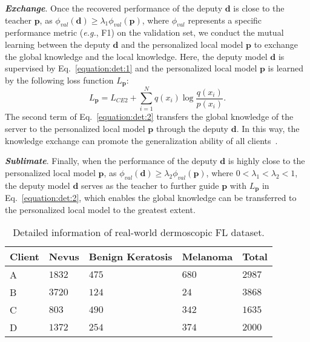 \documentclass[runningheads]{llncs}
\begin{document}
\noindent\textit{\textbf{Exchange}}. 
Once the recovered performance of the deputy $\bm{d}$ is close to the teacher $\bm{p}$, as $\phi_{val}(\bm{d})\geq \lambda_1\phi_{val}(\bm{p})$, where $\phi_{val}$ represents a specific performance metric (\textit{e.g.}, F1) on the validation set, we conduct the mutual learning \cite{deep_mutual} between the deputy $\bm{d}$ and the personalized local model $\bm{p}$ to exchange the global knowledge and the local knowledge. Here, the deputy model $\bm{d}$ is supervised by Eq.~\eqref{equation:det:1} and the personalized local model $\bm{p}$ is learned by the following loss function $L_{\bm{p}}$:
\begin{equation}\label{equation:det:2}
    L_{\bm{p}} = L_{CE2} + \sum_{i=1}^{N} \textit{q} (\textit{x}_i)\log \frac{\textit{q} (\textit{x}_i) }{\textit{p} (\textit{x}_i)}.
\end{equation}
The second term of Eq.~\eqref{equation:det:2} transfers the global knowledge of the server to the personalized local model $\bm{p}$ through the deputy $\bm{d}$.
In this way, the knowledge exchange can promote the generalization ability of all clients~\cite{deep_mutual}.

\noindent\textit{\textbf{Sublimate}}. Finally, when the performance of the deputy $\bm{d}$ is highly close to the personalized local model $\bm{p}$, as $\phi_{val}(\bm{d}) \geq \lambda_2\phi_{val}(\bm{p})$, where $0<\lambda_{1}<\lambda_{2}<1$, the deputy model $\bm{d}$ serves as the teacher to further guide $\bm{p}$ with $L_{\bm{p}}$ in Eq.~\eqref{equation:det:2}, which enables the global knowledge can be transferred to the personalized local model to the greatest extent.

\begin{table}[b]
	\centering
\renewcommand\arraystretch{1.0}
\setlength{\tabcolsep}{1.5pt}	
	\caption{Detailed information of real-world dermoscopic FL dataset.}\label{fl_dataset}
    \begin{tabular}{p{1cm}<{\centering}|p{2cm}<{\centering}|p{2.5cm}<{\centering}|p{2cm}<{\centering}|p{2cm}<{\centering}}
        \toprule[1pt]
        Client         & Nevus & Benign Keratosis & Melanoma & Total \\ \hline
        A & $1832$  & $475$              & $680$      & $2987$  \\
        B & $3720$  & $124$              & $24$       & $3868$  \\
        C & $803$   & $490$              & $342$      & $1635$  \\
        D & $1372$  & $254$              & $374$      & $2000$  \\
        \bottomrule[1pt]
    \end{tabular}
\label{tab0}
\end{table}
\end{document}
